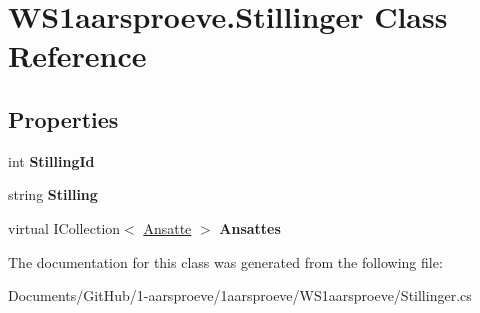 \hypertarget{class_w_s1aarsproeve_1_1_stillinger}{}\section{W\+S1aarsproeve.\+Stillinger Class Reference}
\label{class_w_s1aarsproeve_1_1_stillinger}
\subsection*{Properties}
\begin{DoxyCompactItemize}
\item 
\hypertarget{class_w_s1aarsproeve_1_1_stillinger_a5b6362128a503cddc2b5aad7312bf235}{}int {\bfseries Stilling\+Id}\label{class_w_s1aarsproeve_1_1_stillinger_a5b6362128a503cddc2b5aad7312bf235}

\item 
\hypertarget{class_w_s1aarsproeve_1_1_stillinger_a661d6d4f5bfc9e65a2d6a3c32f681695}{}string {\bfseries Stilling}\label{class_w_s1aarsproeve_1_1_stillinger_a661d6d4f5bfc9e65a2d6a3c32f681695}

\item 
\hypertarget{class_w_s1aarsproeve_1_1_stillinger_ae2b7ade27eaa3ce08317274dcf155cc5}{}virtual I\+Collection$<$ \hyperlink{class_w_s1aarsproeve_1_1_ansatte}{Ansatte} $>$ {\bfseries Ansattes}\label{class_w_s1aarsproeve_1_1_stillinger_ae2b7ade27eaa3ce08317274dcf155cc5}

\end{DoxyCompactItemize}


The documentation for this class was generated from the following file\+:\begin{DoxyCompactItemize}
\item 
Documents/\+Git\+Hub/1-\/aarsproeve/1aarsproeve/\+W\+S1aarsproeve/Stillinger.\+cs\end{DoxyCompactItemize}
